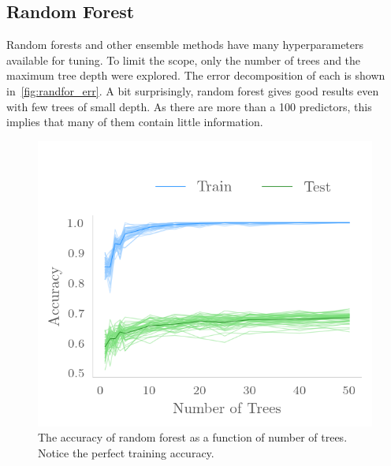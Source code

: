 \subsection{Random Forest}

Random forests and other ensemble methods have many hyperparameters
available for tuning. To limit the scope, only the number of trees and the
maximum tree depth were explored. The error decomposition of each is shown
in~\cref{fig:randfor_err}. A bit surprisingly, random forest gives good results
even with few trees of small depth. As there are more than a 100 predictors,
this implies that many of them contain little information.

\begin{figure}[H]
    \centering
    \includegraphics{Figures/randforest_bootstrap.png}
    \caption{The accuracy of random forest as a function of number of trees.
    Notice the perfect training accuracy.}
    \label{fig:randfor}
\end{figure}

